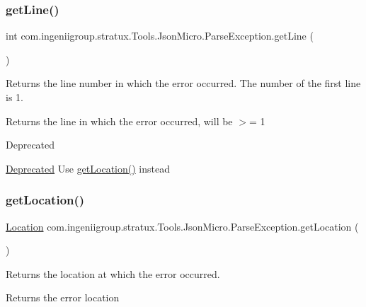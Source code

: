 \subsubsection{\texorpdfstring{get\+Line()}{getLine()}}
{\footnotesize\ttfamily int com.\+ingeniigroup.\+stratux.\+Tools.\+Json\+Micro.\+Parse\+Exception.\+get\+Line (\begin{DoxyParamCaption}{ }\end{DoxyParamCaption})}

Returns the line number in which the error occurred. The number of the first line is 1.

\begin{DoxyReturn}{Returns}
the line in which the error occurred, will be $>$= 1 
\end{DoxyReturn}
\begin{DoxyRefDesc}{Deprecated}
\item[\hyperlink{deprecated__deprecated000017}{Deprecated}]Use \hyperlink{classcom_1_1ingeniigroup_1_1stratux_1_1_tools_1_1_json_micro_1_1_parse_exception_afdae6799272dd08bfff13f37bc91396a}{get\+Location()} instead \end{DoxyRefDesc}
\mbox{\label{classcom_1_1ingeniigroup_1_1stratux_1_1_tools_1_1_json_micro_1_1_parse_exception_afdae6799272dd08bfff13f37bc91396a}} 
\subsubsection{\texorpdfstring{get\+Location()}{getLocation()}}
{\footnotesize\ttfamily \hyperlink{classcom_1_1ingeniigroup_1_1stratux_1_1_tools_1_1_json_micro_1_1_location}{Location} com.\+ingeniigroup.\+stratux.\+Tools.\+Json\+Micro.\+Parse\+Exception.\+get\+Location (\begin{DoxyParamCaption}{ }\end{DoxyParamCaption})}

Returns the location at which the error occurred.

\begin{DoxyReturn}{Returns}
the error location 
\end{DoxyReturn}
\mbox{\label{classcom_1_1ingeniigroup_1_1stratux_1_1_tools_1_1_json_micro_1_1_parse_exception_a245077b044874da65760943002ffdfa0}} 
